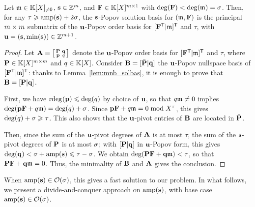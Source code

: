 \documentclass[preprint]{sig-alternate-05-2015}
\begin{document}
\vspace{-0.15cm}
\begin{lem}
  \label{lem:modsys_one_small}
  Let $\modulus \in \modSpace$, $\shifts \in \shiftSpace$, and $\sys \in
  \polMatSpace[\nbun][1]$ with $\deg(\sys) < \deg(\modulus) = \degMod$. Then,
  for any $\tau \ge \amp+2\degMod$, the $\shifts$-Popov solution basis for
  $(\modulus,\sys)$ is the principal $\nbun \times \nbun$ submatrix of the
  $\shifts[u]$-Popov order basis for $\trsp{ [\trsp{\sys} | \modulus] }$ and
  $\tau$, with $\shifts[u] = (\shifts,\min(\shifts)) \in \shiftSpace[\nbun+1]$.
\end{lem}
\begin{proof}
  Let $\mat{A}
    = \left[ \begin{smallmatrix}
        \msb & \col{q} \\
        \row{p} & q 
    \end{smallmatrix} \right]$
  denote the $\shifts[u]$-Popov order basis for $\trsp{
    [\trsp{\sys} | \modulus] }$ and $\tau$,
  where $\mat{P} \in \polMatSpace[\nbun]$
  and $q \in \polRing$. Consider $\mat{B} = [\bar{\mat{P}} | \bar{\col{q}} ]$
  the $\shifts[u]$-Popov nullspace basis of $\trsp{[\trsp{\sys} | \modulus]}$:
  thanks to Lemma~\ref{lem:mnb_solbas}, it is enough to prove that $\mat{B} =
  [\mat{P}|\col{q}]$.

  First, we have $\rdeg{\row{p}} \le \deg(q)$ by choice of $\shifts[u]$, so
  that $q \modulus \neq 0$ implies $\deg(\row{p} \sys + q \modulus) = \deg(q) +
  \degMod$. Since $\row{p} \sys + q \modulus = 0 \bmod X^{\tau}$, this gives
  $\deg(q) + \degMod \ge \tau$. This also shows that the $\shifts[u]$-pivot
  entries of $\mat{B}$ are located in $\bar{\mat{P}}$.

  Then, since the sum of the $\shifts[u]$-pivot degrees of $\mat{A}$ is at most
  $\tau$, the sum of the $\shifts$-pivot degrees of $\mat{P}$ is at most
  $\degMod$; with $[\mat{P}|\col{q}]$ in $\shifts[u]$-Popov form, this gives
  $\deg(\col{q}) < \degMod + \amp \le \tau-\degMod$. We obtain $\deg(\mat{P}
  \sys + \col{q} \modulus) < \tau$, so that $\mat{P} \sys + \col{q} \modulus =
  0$.
  Thus, the minimality of $\mat{B}$ and $\mat{A}$ gives the conclusion.
\end{proof}

\vspace{-0.15cm}
When $\amp \in \bigO{\degMod}$, this gives a fast solution to our problem. In
what follows, we present a divide-and-conquer approach on $\amp$, with base
case $\amp \in \bigO{\degMod}$.
\end{document}
